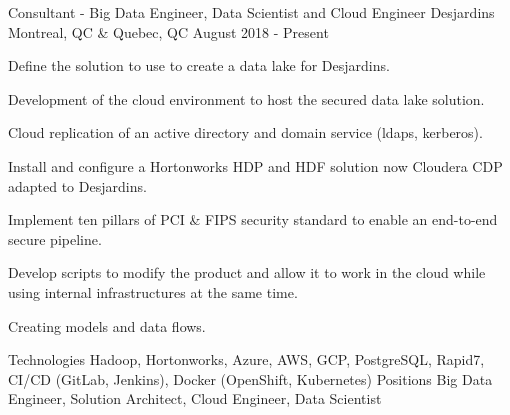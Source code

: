 

\begin{cventries}

  \cventry
    {Consultant - Big Data Engineer, Data Scientist and Cloud Engineer}
    {Desjardins}
    {Montreal, QC \& Quebec, QC}
    {August 2018 - Present}
    {
      \begin{cvitems}
        \item {Define the solution to use to create a data lake for Desjardins.}
        \item {Development of the cloud environment to host the secured data lake solution.}
        \item {Cloud replication of an active directory and domain service (ldaps, kerberos).}
        \item {Install and configure a Hortonworks HDP and HDF solution now Cloudera CDP adapted to Desjardins.}
        \item {Implement ten pillars of PCI \& FIPS security standard to enable an end-to-end secure pipeline.}
        \item {Develop scripts to modify the product and allow it to work in the cloud while using internal infrastructures at the same time.}
        \item {Creating models and data flows.}
        \vspace{2mm}
        \begin{cvskills}
          \cvskill
          {Technologies}
    	  {Hadoop, Hortonworks, Azure, AWS, GCP, PostgreSQL, Rapid7, CI/CD (GitLab, Jenkins), Docker (OpenShift, Kubernetes)}
    	  \cvskill
          {Positions}
    	  {Big Data Engineer, Solution Architect, Cloud Engineer, Data Scientist}
        \end{cvskills}
        \begin{cvsubentries}
        \end{cvsubentries}
      \end{cvitems}
    }


\end{cventries}

